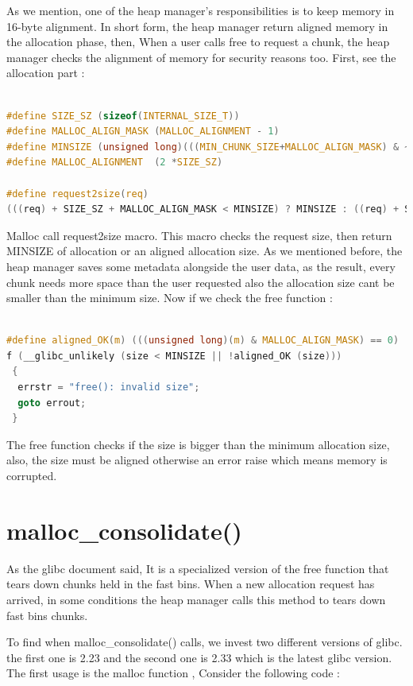 \documentclass{masterthesis}
\newcommand*\libc{glibc}
\newcommand*\fb{fast bins}
\begin{document}
As we mention, one of the heap manager's responsibilities is to keep memory in 16-byte alignment. In short form, the heap manager return aligned memory in the allocation phase, then, When a user calls free to request a chunk, the heap manager checks the alignment of memory for security reasons too. First, see the allocation part :
\begin{lstlisting}[language=c,frame=tlrb]

#define SIZE_SZ (sizeof(INTERNAL_SIZE_T))
#define MALLOC_ALIGN_MASK (MALLOC_ALIGNMENT - 1)
#define MINSIZE (unsigned long)(((MIN_CHUNK_SIZE+MALLOC_ALIGN_MASK) & ~MALLOC_ALIGN_MASK))
#define MALLOC_ALIGNMENT  (2 *SIZE_SZ)

#define request2size(req)
(((req) + SIZE_SZ + MALLOC_ALIGN_MASK < MINSIZE) ? MINSIZE : ((req) + SIZE_SZ + MALLOC_ALIGN_MASK) & ~MALLOC_ALIGN_MASK)
\end{lstlisting}
Malloc call request2size macro. This macro checks the request size, then return MINSIZE of allocation or an aligned allocation size. As we mentioned before, the heap manager saves some metadata alongside the user data, as the result, every chunk needs more space than the user requested also the allocation size cant be smaller than the minimum size. Now if we check the free function :

\begin{lstlisting}[language=c,frame=tlrb]

#define aligned_OK(m) (((unsigned long)(m) & MALLOC_ALIGN_MASK) == 0)
f (__glibc_unlikely (size < MINSIZE || !aligned_OK (size)))
 {
  errstr = "free(): invalid size";
  goto errout;
 }
\end{lstlisting}
The free function checks if the size is bigger than the minimum allocation size, also, the size must be aligned otherwise an error raise which means memory is corrupted.

\section{malloc\_consolidate()}
As the \libc{} document said, It is a specialized version of the free function that tears down chunks held in the \fb{}. When a new allocation request has arrived, in some conditions the heap manager calls this method to tears down \fb{} chunks. 

To find when malloc\_consolidate() calls, we invest two different versions of \libc{}. the first one is 2.23 and the second one is 2.33 which is the latest \libc{} version. The first usage is the malloc function , Consider the following code :
\end{document}
